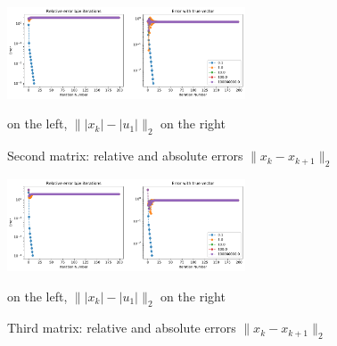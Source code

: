 \documentclass[12pt,twoside]{article}
\begin{document}
\begin{enumerate}
\begin{enumerate}
\begin{figure}[H]
	\centering
	\includegraphics[width=200pt]{figures/random_init_3.pdf}
	\caption{Second matrix: relative and absolute errors  $\| x_k - x_{k+1}\|_2$} on the left,  $\| |x_k| - |u_1| \|_2$ on the right
	\label{fig1}
\end{figure}

\begin{figure}[H]
	\centering
	\includegraphics[width=200pt]{figures/random_init_4.pdf}
	\caption{Third matrix: relative and absolute errors  $\| x_k - x_{k+1}\|_2$} on the left,  $\| |x_k| - |u_1| \|_2$ on the right
	\label{fig1}
\end{figure}

\end{enumerate}

\end{enumerate}
\end{document}
